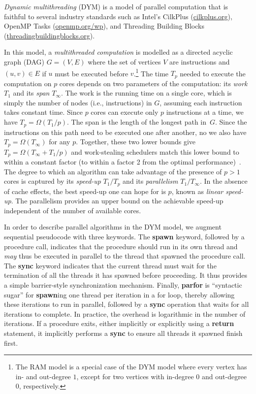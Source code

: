{\em Dynamic multithreading} (DYM) \cite[Chapter~27]{Cormen2009} is a
model of parallel computation that is faithful to several industry standards
such as Intel's CilkPlus (\url{cilkplus.org}), OpenMP Tasks
(\url{openmp.org/wp}), and Threading Building
Blocks (\url{threadingbuildingblocks.org}).

In this model, a {\em multithreaded computation} is modelled as a directed
acyclic graph (DAG) $G=(V,E)$ where the set of vertices $V$ are instructions
and $(u,v) \in E$ if $u$ must be executed before $v$.\footnote{The
  RAM model is a special case of the DYM model where every vertex has in-
  and out-degree $1$, except for two vertices with in-degree $0$ and
  out-degree $0$, respectively.}
The time $T_p$ needed to execute the computation on $p$ cores depends on
two parameters of the computation: its {\em work} $T_1$ and its {\em span}
$T_\infty$.
The work is the running time on a single core, which is simply the
number of nodes (i.e., instructions) in $G$, assuming each instruction takes
constant time.
Since $p$ cores can execute only $p$ instructions at a time, we have
$T_p = \Omega(T_1/p)$.
The span is the length of the longest path in~$G$.
Since the instructions on this path need to be executed one after another, no
we also have $T_p = \Omega(T_\infty)$ for any $p$.
Together, these two lower bounds give $T_p = \Omega(T_\infty + T_1/p)$ and
work-stealing schedulers match this lower bound to within a constant factor
(to within a factor 2 from the optimal
performance)~\cite{Blumofe:1999:SMC:324133.324234}.
The degree to which an algorithm can take advantage of the presence of $p > 1$
cores is captured by its {\em speed-up} $T_1 / T_p$ and its
{\em parallelism} $T_1 / T_\infty$.
In the absence of cache effects, the best speed-up one can hope for is $p$,
known as {\em linear speed-up}.
The parallelism provides an upper bound on the achievable speed-up independent
of the number of available cores.

In order to describe parallel algorithms in the DYM model, we augment sequential
pseudocode with three keywords.
The {\bf spawn} keyword, followed by a procedure call, indicates that the
procedure should run in its own thread and {\em may} thus be executed in
parallel to the thread that spawned the procedure call.
The {\bf sync} keyword indicates that the current thread must wait for the
termination of all the threads it has spawned before proceeding.
It thus provides a simple barrier-style synchronization mechanism.
Finally, {\bf parfor} is ``syntactic sugar'' for {\bf spawn}ing one thread per
iteration in a for loop, thereby allowing these iterations to run in parallel,
followed by a {\bf sync} operation that waits for all iterations to complete.
In practice, the overhead is logarithmic in the number of iterations.
If a procedure exits, either implicitly or explicitly using a {\bf return}
statement, it implicitly performs a {\bf sync} to ensure all threads it spawned
finish first.
